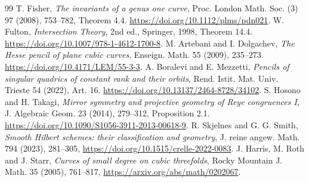 \documentclass[11pt,a4paper]{ltjsarticle}
\begin{document}
\begin{thebibliography}{99}
 T. Fisher, \emph{The invariants of a genus one curve}, Proc. London Math. Soc. (3) 97 (2008), 753--782, Theorem 4.4. \url{https://doi.org/10.1112/plms/pdn021}.
 W. Fulton, \emph{Intersection Theory}, 2nd ed., Springer, 1998, Theorem 14.4. \url{https://doi.org/10.1007/978-1-4612-1700-8}.
 M. Artebani and I. Dolgachev, \emph{The Hesse pencil of plane cubic curves}, Enseign. Math. 55 (2009), 235--273. \url{https://doi.org/10.4171/LEM/55-3-3}.
 A. Boralevi and E. Mezzetti, \emph{Pencils of singular quadrics of constant rank and their orbits}, Rend. Istit. Mat. Univ. Trieste 54 (2022), Art. 16. \url{https://doi.org/10.13137/2464-8728/34102}.
 S. Hosono and H. Takagi, \emph{Mirror symmetry and projective geometry of Reye congruences I}, J. Algebraic Geom. 23 (2014), 279--312, Proposition 2.1. \url{https://doi.org/10.1090/S1056-3911-2013-00618-9}.
 R. Skjelnes and G. G. Smith,
\emph{Smooth Hilbert schemes: their classification and geometry},
J. reine angew. Math. 794 (2023), 281--305,
\url{https://doi.org/10.1515/crelle-2022-0083}.
 J. Harris, M. Roth and J. Starr,
\emph{Curves of small degree on cubic threefolds},
Rocky Mountain J. Math. 35 (2005), 761--817,
\url{https://arxiv.org/abs/math/0202067}.

\end{thebibliography}
\end{document}
